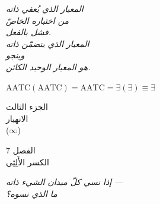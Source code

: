 \documentclass[10pt, openany, oneside]{book}
\renewcommand{\normalsize}{\fontsize{10}{13}\selectfont}
\renewcommand{\large}{\fontsize{11.5}{14}\selectfont}
\renewcommand{\LARGE}{\fontsize{15}{18}\selectfont}
\renewcommand{\huge}{\fontsize{17}{21}\selectfont}
\begin{document}
\vspace{0.5em}

\begin{center}
    \itshape
    المعيار الذي يُعفي ذاته\\
    من اختباره الخاصّ\\
    فشل بالفعل.\\[0.8em]
    المعيار الذي يتضمّن ذاته\\
    وينجو\\
    هو المعيار الوحيد الكائن.
\end{center}

\vspace{0.5em}

\begin{center}
    $\text{AATC}(\text{AATC}) = \text{AATC} = \exists(\exists) \equiv \exists$
\end{center}


\newpage
\thispagestyle{empty}
\vspace*{\fill}
\begin{center}
    {\LARGE الجزء الثالث}\\[1em]
    {\large الانهيار}\\[0.5em]
    {\normalsize ($\infty$)}
\end{center}
\vspace*{\fill}
\newpage

%
%
%

\newpage

\begin{center}
    {\huge الفصل 7}\\[0.3em]
    {\large الكسر الأَلِثِي}
\end{center}

\vspace{1.5em}

\begin{center}
    \itshape
    إذا نسي كلّ ميدان الشيء ذاته ---\\
    ما الذي نسوه؟
\end{center}
\end{document}
